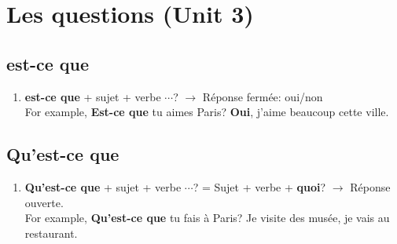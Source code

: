 \documentclass[10pt,a4paper,twoside]{article} %
\begin{document}
\section*{Les questions (Unit 3)}
\subsection*{est-ce que}
\begin{enumerate}
    \item \textbf{est-ce que} + sujet + verbe $\cdots$? $\rightarrow$ Réponse fermée: oui/non \\
    For example, \textbf{Est-ce que} tu aimes Paris? \textbf{Oui}, j'aime beaucoup cette ville. \\
\end{enumerate}

\subsection*{Qu'est-ce que}
\begin{enumerate}
    \item \textbf{Qu'est-ce que} + sujet + verbe $\cdots$? = Sujet + verbe + \textbf{quoi}? $\rightarrow$ Réponse ouverte. \\
    For example, \textbf{Qu'est-ce que} tu fais à Paris? Je visite des musée, je vais au restaurant. \\
\end{enumerate}
\end{document}
